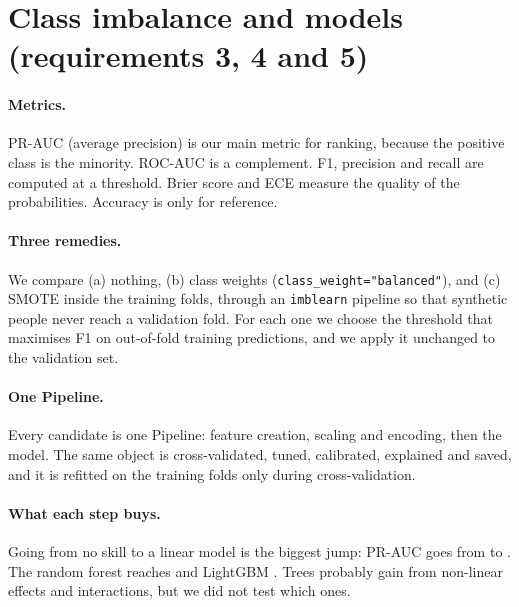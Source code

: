 \documentclass[11pt,a4paper]{article}
\newcommand{\tablefile}[1]{\begin{center}\small\resizebox{\linewidth}{!}{}\end{center}}
\begin{document}
\begin{table}[H]
\centering\small

\caption{Raw against engineered variables (5-fold CV on the training set, default hyperparameters).}\label{tab:ablation}
\end{table}

\section{Class imbalance and models (requirements 3, 4 and 5)}
\paragraph{Metrics.} PR-AUC (average precision) is our main metric for ranking, because the positive class is the minority. ROC-AUC is a complement. F1, precision and recall are computed at a threshold. Brier score and ECE measure the quality of the probabilities. Accuracy is only for reference.

\paragraph{Three remedies.} We compare (a) nothing, (b) class weights (\texttt{class\_weight="balanced"}), and (c) SMOTE inside the training folds, through an \texttt{imblearn} pipeline so that synthetic people never reach a validation fold. For each one we choose the threshold that maximises F1 on out-of-fold training predictions, and we apply it unchanged to the validation set.

\paragraph{One Pipeline.} Every candidate is one Pipeline: feature creation, scaling and encoding, then the model. The same object is cross-validated, tuned, calibrated, explained and saved, and it is refitted on the training folds only during cross-validation.

\tablefile{table_models.tex}
\label{tab:models}

\paragraph{What each step buys.} Going from no skill to a linear model is the biggest jump: PR-AUC goes from \cvDummyNone{} to \cvLogNone. The random forest reaches \cvRfNone{} and LightGBM \cvLgbNone. Trees probably gain from non-linear effects and interactions, but we did not test which ones.
\end{document}
